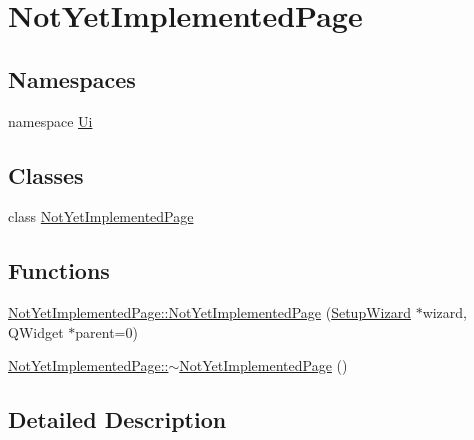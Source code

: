 \hypertarget{group___not_yet_implemented_page}{\section{Not\-Yet\-Implemented\-Page}
\label{group___not_yet_implemented_page}
}
\subsection*{Namespaces}
\begin{DoxyCompactItemize}
\item 
namespace \hyperlink{namespace_ui}{Ui}
\end{DoxyCompactItemize}
\subsection*{Classes}
\begin{DoxyCompactItemize}
\item 
class \hyperlink{class_not_yet_implemented_page}{Not\-Yet\-Implemented\-Page}
\end{DoxyCompactItemize}
\subsection*{Functions}
\begin{DoxyCompactItemize}
\item 
\hyperlink{group___not_yet_implemented_page_ga2d16a7a61f866fb399f6e888957a8fdc}{Not\-Yet\-Implemented\-Page\-::\-Not\-Yet\-Implemented\-Page} (\hyperlink{class_setup_wizard}{Setup\-Wizard} $\ast$wizard, Q\-Widget $\ast$parent=0)
\item 
\hyperlink{group___not_yet_implemented_page_gaddca330fa063b9b729adc5f9eb7f3eeb}{Not\-Yet\-Implemented\-Page\-::$\sim$\-Not\-Yet\-Implemented\-Page} ()
\end{DoxyCompactItemize}


\subsection{Detailed Description}


